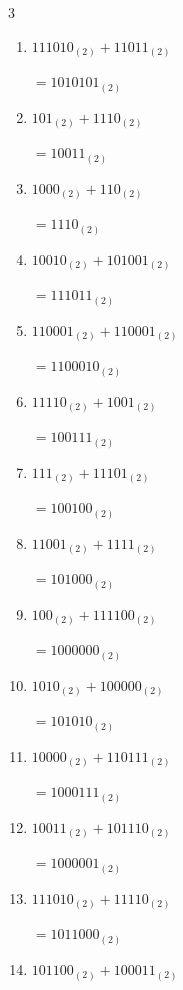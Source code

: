 \begin{multicols}{3}
\begin{enumerate}
        $=1010100_{(2)}$

  \item $111010_{(2)} + 11011_{(2)}$

        $=1010101_{(2)}$

  \item $101_{(2)} + 1110_{(2)}$

        $=10011_{(2)}$

  \item $1000_{(2)} + 110_{(2)}$

        $=1110_{(2)}$

  \item $10010_{(2)} + 101001_{(2)}$

        $=111011_{(2)}$

  \item $110001_{(2)} + 110001_{(2)}$

        $=1100010_{(2)}$

  \item $11110_{(2)} + 1001_{(2)}$

        $=100111_{(2)}$

\columnbreak %

  \item $111_{(2)} + 11101_{(2)}$

        $=100100_{(2)}$

  \item $11001_{(2)} + 1111_{(2)}$

        $=101000_{(2)}$

  \item $100_{(2)} + 111100_{(2)}$

        $=1000000_{(2)}$

  \item $1010_{(2)} + 100000_{(2)}$

        $=101010_{(2)}$

  \item $10000_{(2)} + 110111_{(2)}$

        $=1000111_{(2)}$

  \item $10011_{(2)} + 101110_{(2)}$

        $=1000001_{(2)}$

  \item $111010_{(2)} + 11110_{(2)}$

        $=1011000_{(2)}$

  \item $101100_{(2)} + 100011_{(2)}$


\end{enumerate}
\end{multicols}
